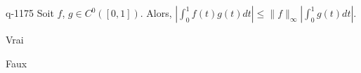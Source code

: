 \begin{truefalse}{q-1175}
Soit $f$, $g\in C^0([0,1])$. Alors, $\left|\int_0^1f(t)g(t)dt\right|\leq \|f\|_\infty \left|\int_0^1g(t)dt\right|$.
\item Vrai
\item* Faux
\end{truefalse}


